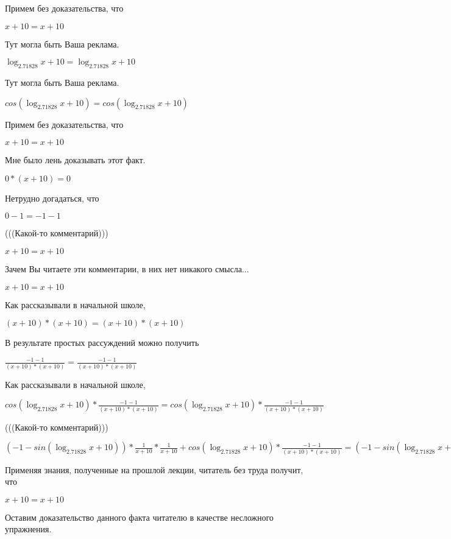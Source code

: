 \documentclass[12pt,a4paper,fleqn]{article}
\theoremstyle{definition}
\begin{document}
Примем без доказательства, что 

$ x  +  10  =  x  +  10 $

Тут могла быть Ваша реклама. 

$\log_{ 2.71828 }{ x  +  10 } = \log_{ 2.71828 }{ x  +  10 }$

Тут могла быть Ваша реклама. 

$cos(\log_{ 2.71828 }{ x  +  10 }) = cos(\log_{ 2.71828 }{ x  +  10 })$

Примем без доказательства, что 

$ x  +  10  =  x  +  10 $

Мне было лень доказывать этот факт.

$ 0  * ( x  +  10 ) =  0 $

Нетрудно догадаться, что 

$ 0  -  1  =  -1  -  1 $

(((Какой-то комментарий))) 

$ x  +  10  =  x  +  10 $

Зачем Вы читаете эти комментарии, в них нет никакого смысла... 

$ x  +  10  =  x  +  10 $

Как рассказывали в начальной школе, 

$( x  +  10 ) * ( x  +  10 ) = ( x  +  10 ) * ( x  +  10 )$

В результате простых рассуждений можно получить 

$\frac{ -1  -  1 }{( x  +  10 ) * ( x  +  10 )}
 = \frac{ -1  -  1 }{( x  +  10 ) * ( x  +  10 )}
$

Как рассказывали в начальной школе, 

$cos(\log_{ 2.71828 }{ x  +  10 }) * \frac{ -1  -  1 }{( x  +  10 ) * ( x  +  10 )}
 = cos(\log_{ 2.71828 }{ x  +  10 }) * \frac{ -1  -  1 }{( x  +  10 ) * ( x  +  10 )}
$

(((Какой-то комментарий))) 

$( -1  - sin(\log_{ 2.71828 }{ x  +  10 })) * \frac{ 1 }{ x  +  10 }
 * \frac{ 1 }{ x  +  10 }
 + cos(\log_{ 2.71828 }{ x  +  10 }) * \frac{ -1  -  1 }{( x  +  10 ) * ( x  +  10 )}
 = ( -1  - sin(\log_{ 2.71828 }{ x  +  10 })) * \frac{ 1 }{ x  +  10 }
 * \frac{ 1 }{ x  +  10 }
 + cos(\log_{ 2.71828 }{ x  +  10 }) * \frac{ -1  -  1 }{( x  +  10 ) * ( x  +  10 )}
$

Применяя знания, полученные на прошлой лекции, читатель без труда получит, что 

$ x  +  10  =  x  +  10 $

Оставим доказательство данного факта читателю в качестве несложного упражнения. 
\end{document}
